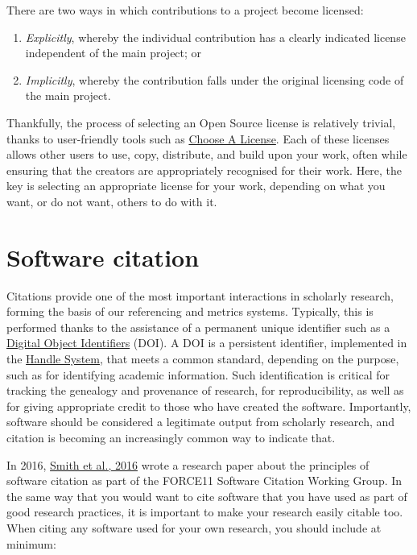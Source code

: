 \documentclass[]{book}
\providecommand{\tightlist}{%
  \setlength{\itemsep}{0pt}\setlength{\parskip}{0pt}}
\begin{document}
There are two ways in which contributions to a project become licensed:

\begin{enumerate}
\def\labelenumi{\arabic{enumi}.}
\tightlist
\item
  \emph{Explicitly}, whereby the individual contribution has a clearly indicated license independent of the main project; or
\item
  \emph{Implicitly}, whereby the contribution falls under the original licensing code of the main project.
\end{enumerate}

Thankfully, the process of selecting an Open Source license is relatively trivial, thanks to user-friendly tools such as \href{https://choosealicense.com/}{Choose A License}. Each of these licenses allows other users to use, copy, distribute, and build upon your work, often while ensuring that the creators are appropriately recognised for their work. Here, the key is selecting an appropriate license for your work, depending on what you want, or do not want, others to do with it.

\hypertarget{software-citation}{%
\section{Software citation }\label{software-citation}}

Citations provide one of the most important interactions in scholarly research, forming the basis of our referencing and metrics systems. Typically, this is performed thanks to the assistance of a permanent unique identifier such as a \href{https://en.wikipedia.org/wiki/Digital_object_identifier}{Digital Object Identifiers} (DOI). A DOI is a persistent identifier, implemented in the \href{https://en.wikipedia.org/wiki/Handle_System}{Handle System}, that meets a common standard, depending on the purpose, such as for identifying academic information. Such identification is critical for tracking the genealogy and provenance of research, for reproducibility, as well as for giving appropriate credit to those who have created the software. Importantly, software should be considered a legitimate output from scholarly research, and citation is becoming an increasingly common way to indicate that.

In 2016, \href{https://github.com/OpenScienceMOOC/Module-5-Open-Research-Software-and-Open-Source/blob/master/Reading\%20Material_Open\%20Source\%20and\%20Open\%20Research\%20Software/Smith\%20et\%20al.\%2C\%202016.pdf}{Smith et al., 2016} wrote a research paper about the principles of software citation as part of the FORCE11 Software Citation Working Group. In the same way that you would want to cite software that you have used as part of good research practices, it is important to make your research easily citable too. When citing any software used for your own research, you should include at minimum:
\end{document}
